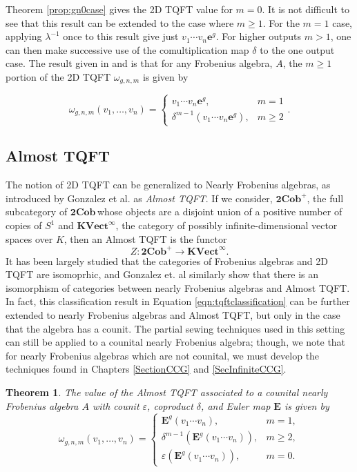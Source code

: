 \documentclass{amsart}
\newcommand{\be}{\begin{equation}}
\newcommand{\ee}{\end{equation}}
\newcommand{\eps}{\varepsilon}
\newcommand{\eul}{\mathbf{e}}
\newcommand{\bige}{\mathbf{E}}
\newcommand{\cob}{$\mathbf{2Cob}$\,}
\newtheorem{Thm}[Lem]{Theorem}
\theoremstyle{definition}
\begin{document}
 Theorem \ref{prop:gn0case} gives the 2D TQFT value for $m=0$. It is not difficult to see that this result can be extended to the case where $m\geq1$. For the $m=1$ case, applying $\lambda^{-1}$ once to this result give just $v_1\cdots v_n\eul^g.$ For higher outputs $m>1$, one can then make successive use of the comultiplication map $\delta$ to the one output case. The result given in \cite{thesis} and \cite{DaDu} is that for any Frobenius algebra, $A$, the $m\geq1$ portion of the 2D TQFT $\omega_{g,n,m}$ is given by
    

    
        \be\label{eqn:tqftclassification}
        \omega_{g,n,m}(v_1,\ldots,v_n)=\begin{cases}
            v_1\cdots v_n\eul^g,& m=1\\
            \delta^{m-1}(v_1\cdots v_n\eul^g),& m\geq 2
        \end{cases}.
        \ee

\subsection{Almost TQFT}
The notion of 2D TQFT can be generalized to Nearly Frobenius algebras, as introduced by Gonzalez et al. \cite{GLSU} as \textit{Almost TQFT}. If we consider, $\mathbf{2Cob^+}$, the full subcategory of \cob whose objects are a disjoint union of a positive number of copies of $S^1$ and $\mathbf{\textbf{KVect}^\infty}$, the category of possibly infinite-dimensional vector spaces over $K$, then an Almost TQFT is the functor \be
Z:\mathbf{2Cob^+}\longrightarrow\mathbf{\textbf{KVect}^\infty}.
\ee
It has been largely studied that the categories of Frobenius algebras and 2D TQFT are isomoprhic, and Gonzalez et. al similarly show that there is an isomorphism of categories between nearly Frobenius algebras and Almost TQFT.\\


In fact, this classification result in Equation \ref{eqn:tqftclassification} can be further extended to nearly Frobenius algebras and Almost TQFT, but only in the case that the algebra has a counit. The partial sewing techniques used in this setting can still be applied to a counital nearly Frobenius algebra; though, we note that for nearly Frobenius algebras which are not counital, we must develop the techniques found in Chapters \ref{SectionCCG} and \ref{SecInfiniteCCG}.
\begin{Thm} \cite{thesis, DaDu}\label{theorem A} 
	 The value of the Almost TQFT associated to a counital nearly Frobenius algebra $A$ with counit $\eps$, coproduct $\delta$, and Euler map $\bige$ is given by
	\be
	\omega_{g,n,m}(v_1,\ldots,v_n)=\begin{cases}
		\bige^g(v_1\cdots v_n),& m=1,\\
		\delta^{m-1}(\bige^g(v_1\cdots v_n)),& m\geq 2,\\
		\eps(\bige^g(v_1\cdots v_n)),& m=0.
	\end{cases}
	\ee
\end{Thm}
\end{document}
